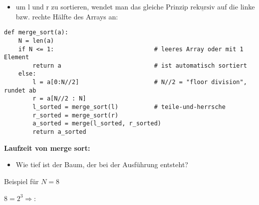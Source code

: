     \begin{itemize}
        \item um l und r zu sortieren, wendet man das gleiche Prinzip $\underline{\text{rekursiv}}$ auf die linke bzw. rechte Hälfte des Arrays an:
    \end{itemize}

    \begin{verbatim}
def merge_sort(a):
    N = len(a)
    if N <= 1:                            # leeres Array oder mit 1 Element
        return a                          # ist automatisch sortiert
    else:
        l = a[0:N//2]                     # N//2 = "floor division", rundet ab
        r = a[N//2 : N]
        l_sorted = merge_sort(l)          # teile-und-herrsche
        r_sorted = merge_sort(r)
        a_sorted = merge(l_sorted, r_sorted)
        return a_sorted
    \end{verbatim}

        \textbf{Laufzeit von merge sort:} \\
        \begin{itemize}
            \item Wie tief ist der Baum, der bei der Ausführung entsteht?
        \end{itemize}

        Beispiel für $N=8$


        \begin{center}
        \end{center}

        $8 = 2^3 \Rightarrow$:  \\

